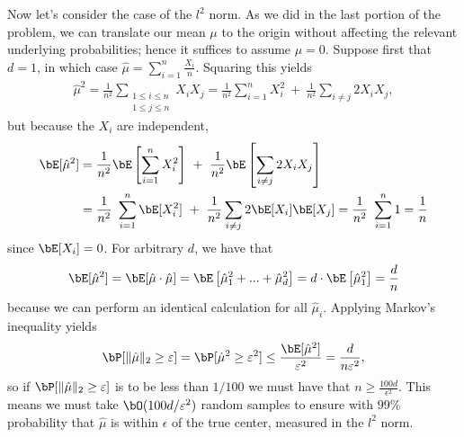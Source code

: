 \begin{homework}[e]
\begin{prf}
    Now let's consider the case of the $l^2$ norm. As we did in the last portion of the problem, we can translate our mean $\mu$ to the origin without affecting the relevant underlying probabilities; hence it suffices to assume $\mu = 0$. Suppose first that $d = 1$, in which case $\hat\mu = \sum_{i=1}^n \frac{X_i}{n}$. Squaring this yields
    \begin{align*}
      \hat\mu^2 = \frac{1}{n^2}\sum_{\substack{1\leq i\leq n\\1\leq j\leq n}} X_iX_j = \frac{1}{n^2}\sum_{i=1}^n X_i^2 ~+~ \frac{1}{n^2}\sum_{i\neq j} 2X_iX_j,
    \end{align*}
    but because the $X_i$ are independent,
    \begin{align*}
      \bE[\hat\mu^2] 
      &= \frac{1}{n^2}\bE\left[\sum_{i=1}^n X_i^2\right] ~+~ \frac{1}{n^2}\bE\left[\sum_{i\neq j} 2X_iX_j\right] \\
      &= \frac{1}{n^2}~\sum_{i=1}^n \bE[X_i^2] ~+~ \frac{1}{n^2}\sum_{i\neq j} 2\bE[X_i]\bE[X_j] = \frac{1}{n^2}~ \sum_{i=1}^n 1 = \frac{1}{n}
    \end{align*}
    since $\bE[X_i] = 0$. For arbitrary $d$, we have that
    \begin{align*}
      \bE[\hat\mu^2] =\bE[\hat\mu \cdot \hat\mu] = \bE\left[\hat\mu_1^2 + ... + \hat\mu_d^2\right] = d \cdot \bE\left[\hat\mu_1^2\right] = \frac{d}{n}
    \end{align*}
    because we can perform an identical calculation for all $\hat\mu_i$. Applying Markov's inequality yields
    \begin{align*}
      \bP[\|\hat\mu\|_2 \geq \epsilon] = \bP[\hat\mu^2 \geq \epsilon^2] \leq \frac{\bE[\hat\mu^2]}{\epsilon^2} = \frac{d}{n\epsilon^2},
    \end{align*}
    so if $\bP[\|\hat\mu\|_2 \geq \epsilon]$ is to be less than $1/100$ we must have that $n \geq \frac{100d}{\epsilon^2}$. This means we must take $\bO(100d/\epsilon^2)$ random samples to ensure with 99\% probability that $\hat\mu$ is within $\epsilon$ of the true center, measured in the $l^2$ norm.
  \end{prf}
\end{homework}


